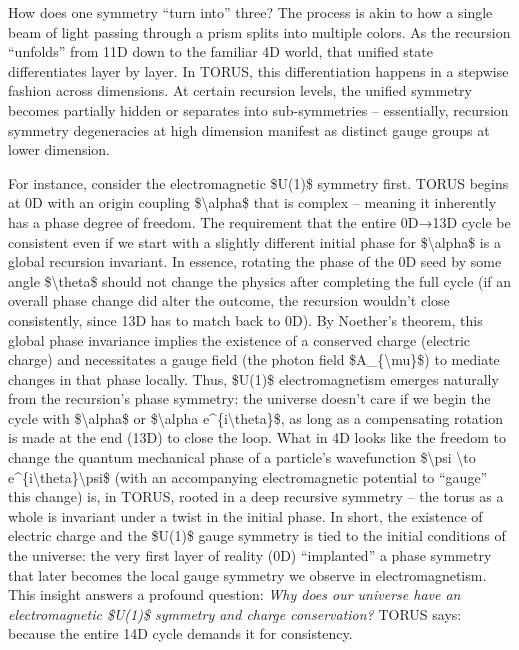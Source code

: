 \documentclass[]{article}
\begin{document}
How does one symmetry ``turn into'' three? The process is akin to how a
single beam of light passing through a prism splits into multiple
colors. As the recursion ``unfolds'' from 11D down to the familiar 4D
world, that unified state differentiates layer by layer. In TORUS, this
differentiation happens in a stepwise fashion across dimensions. At
certain recursion levels, the unified symmetry becomes partially hidden
or separates into sub-symmetries -- essentially, recursion symmetry
degeneracies at high dimension manifest as distinct gauge groups at
lower dimension.

For instance, consider the electromagnetic \$U(1)\$ symmetry first.
TORUS begins at 0D with an origin coupling \$\textbackslash{}alpha\$
that is complex -- meaning it inherently has a phase degree of freedom.
The requirement that the entire 0D→13D cycle be consistent even if we
start with a slightly different initial phase for
\$\textbackslash{}alpha\$ is a global recursion invariant. In essence,
rotating the phase of the 0D seed by some angle
\$\textbackslash{}theta\$ should not change the physics after completing
the full cycle (if an overall phase change did alter the outcome, the
recursion wouldn't close consistently, since 13D has to match back to
0D). By Noether's theorem, this global phase invariance implies the
existence of a conserved charge (electric charge) and necessitates a
gauge field (the photon field \$A\_\{\textbackslash{}mu\}\$) to mediate
changes in that phase locally. Thus, \$U(1)\$ electromagnetism emerges
naturally from the recursion's phase symmetry: the universe doesn't care
if we begin the cycle with \$\textbackslash{}alpha\$ or
\$\textbackslash{}alpha e\^{}\{i\textbackslash{}theta\}\$, as long as a
compensating rotation is made at the end (13D) to close the loop. What
in 4D looks like the freedom to change the quantum mechanical phase of a
particle's wavefunction \$\textbackslash{}psi \textbackslash{}to
e\^{}\{i\textbackslash{}theta\}\textbackslash{}psi\$ (with an
accompanying electromagnetic potential to ``gauge'' this change) is, in
TORUS, rooted in a deep recursive symmetry -- the torus as a whole is
invariant under a twist in the initial phase. In short, the existence of
electric charge and the \$U(1)\$ gauge symmetry is tied to the initial
conditions of the universe: the very first layer of reality (0D)
``implanted'' a phase symmetry that later becomes the local gauge
symmetry we observe in electromagnetism. This insight answers a profound
question: \emph{Why does our universe have an electromagnetic \$U(1)\$
symmetry and charge conservation?} TORUS says: because the entire 14D
cycle demands it for consistency.
\end{document}
